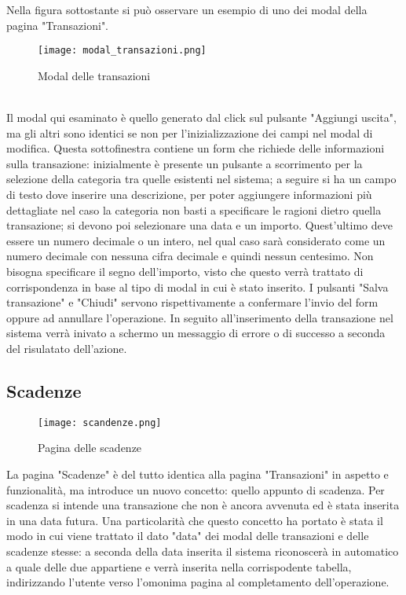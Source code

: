 \documentclass[binding=0.6cm, oneside, noexaminfo, italian]{sapthesis}
\begin{document}
Nella figura sottostante si può osservare un esempio di uno dei modal della pagina "Transazioni". \\
\begin{figure}[h]
    \centering
    \texttt{[image: modal\_transazioni.png]}
    \caption{Modal delle transazioni}
    \label{fig:modal_transazioni}
\end{figure} \\
Il modal qui esaminato è quello generato dal click sul pulsante "Aggiungi uscita", ma gli altri sono identici se non per l'inizializzazione dei campi nel modal di modifica. Questa sottofinestra contiene un form che richiede delle informazioni sulla transazione: inizialmente è presente un pulsante a scorrimento per la selezione della categoria tra quelle esistenti nel sistema; a seguire si ha un campo di testo dove inserire una descrizione, per poter aggiungere informazioni più dettagliate nel caso la categoria non basti a specificare le ragioni dietro quella transazione; si devono poi selezionare una data e un importo. Quest'ultimo deve essere un numero decimale o un intero, nel qual caso sarà considerato come un numero decimale con nessuna cifra decimale e quindi nessun centesimo. Non bisogna specificare il segno dell'importo, visto che questo verrà trattato di corrispondenza in base al tipo di modal in cui è stato inserito. I pulsanti "Salva transazione" e "Chiudi" servono rispettivamente a confermare l'invio del form oppure ad annullare l'operazione. In seguito all'inserimento della transazione nel sistema verrà inivato a schermo un messaggio di errore o di successo a seconda del risulatato dell'azione.
\subsection{Scadenze}
\begin{figure}[h]
    \centering
    \texttt{[image: scandenze.png]}
    \caption{Pagina delle scadenze}
    \label{fig:scadenze}
\end{figure}
La pagina "Scadenze" è del tutto identica alla pagina "Transazioni" in aspetto e funzionalità, ma introduce un nuovo concetto: quello appunto di scadenza. Per scadenza si intende una transazione che non è ancora avvenuta ed è stata inserita in una data futura. Una particolarità che questo concetto ha portato è stata il modo in cui viene trattato il dato "data" dei modal delle transazioni e delle scadenze stesse: a seconda della data inserita il sistema riconoscerà in automatico a quale delle due appartiene e verrà inserita nella corrispodente tabella, indirizzando l'utente verso l'omonima pagina al completamento dell'operazione.
\newpage
\end{document}
